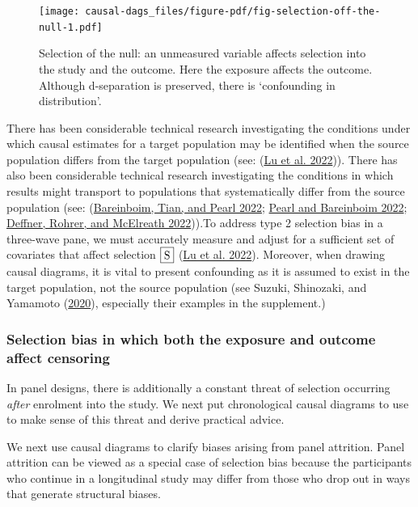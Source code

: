 \documentclass[
  singlecolumn]{article}
\begin{document}
\begin{figure}

{\centering \texttt{[image: causal-dags\_files/figure-pdf/fig-selection-off-the-null-1.pdf]}

}

\caption{\label{fig-selection-off-the-null}Selection of the null: an
unmeasured variable affects selection into the study and the outcome.
Here the exposure affects the outcome. Although d-separation is
preserved, there is `confounding in distribution'.}

\end{figure}

There has been considerable technical research investigating the
conditions under which causal estimates for a target population may be
identified when the source population differs from the target population
(see: (\protect\hyperlink{ref-lu2022}{Lu et al. 2022})). There has also
been considerable technical research investigating the conditions in
which results might transport to populations that systematically differ
from the source population (see:
(\protect\hyperlink{ref-bareinboim2022}{Bareinboim, Tian, and Pearl
2022}; \protect\hyperlink{ref-pearl2022}{Pearl and Bareinboim 2022};
\protect\hyperlink{ref-deffner2022}{Deffner, Rohrer, and McElreath
2022})).To address type 2 selection bias in a three-wave pane, we must
accurately measure and adjust for a sufficient set of covariates that
affect selection \(\framebox{S}\) (\protect\hyperlink{ref-lu2022}{Lu et
al. 2022}). Moreover, when drawing causal diagrams, it is vital to
present confounding as it is assumed to exist in the target population,
not the source population (see Suzuki, Shinozaki, and Yamamoto
(\protect\hyperlink{ref-suzuki2020}{2020}), especially their examples in
the supplement.)

\hypertarget{selection-bias-in-which-both-the-exposure-and-outcome-affect-censoring}{%
\subsubsection{Selection bias in which both the exposure and outcome
affect
censoring}\label{selection-bias-in-which-both-the-exposure-and-outcome-affect-censoring}}

In panel designs, there is additionally a constant threat of selection
occurring \emph{after} enrolment into the study. We next put
chronological causal diagrams to use to make sense of this threat and
derive practical advice.

We next use causal diagrams to clarify biases arising from panel
attrition. Panel attrition can be viewed as a special case of selection
bias because the participants who continue in a longitudinal study may
differ from those who drop out in ways that generate structural biases.
\end{document}
